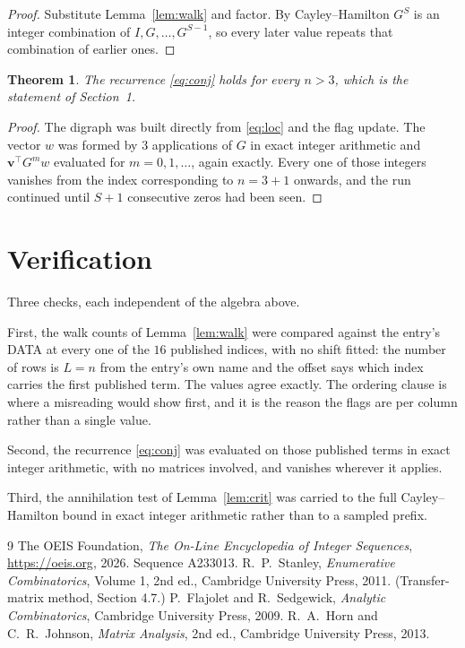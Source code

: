 \documentclass[11pt,a4paper]{article}
\theoremstyle{plain}
\newtheorem{theorem}{Theorem}
\theoremstyle{definition}
\begin{document}
\begin{proof}
Substitute Lemma~\ref{lem:walk} and factor. By Cayley--Hamilton $G^{S}$ is an integer
combination of $I,G,\dots,G^{S-1}$, so every later value repeats that combination of earlier
ones.
\end{proof}

\begin{theorem}
The recurrence \eqref{eq:conj} holds for every $n>3$, which is the statement of
Section~1.
\end{theorem}

\begin{proof}
The digraph was built directly from \eqref{eq:loc} and the flag update. The vector $w$ was
formed by $3$ applications of $G$ in exact integer arithmetic and
$\mathbf{v}^{\!\top}G^{m}w$ evaluated for $m=0,1,\dots$, again exactly. Every one of
those integers vanishes from the index corresponding to $n=3+1$ onwards, and the run
continued until $S+1$ consecutive zeros had been seen.
\end{proof}

\section{Verification}

Three checks, each independent of the algebra above.

First, the walk counts of Lemma~\ref{lem:walk} were compared against the entry's DATA at
every one of the $16$ published indices, with no shift fitted: the number of rows is
$L=n$ from the entry's own name and the offset says which index carries the first
published term. The values agree exactly. The ordering clause is where a misreading would
show first, and it is the reason the flags are per column rather than a single value.

Second, the recurrence \eqref{eq:conj} was evaluated on those published terms in exact
integer arithmetic, with no matrices involved, and vanishes wherever it applies.

Third, the annihilation test of Lemma~\ref{lem:crit} was carried to the full
Cayley--Hamilton bound in exact integer arithmetic rather than to a sampled prefix.

\begin{thebibliography}{9}
 The OEIS Foundation, \emph{The On-Line Encyclopedia of Integer
Sequences}, \url{https://oeis.org}, 2026. Sequence A233013.
 R.~P.~Stanley, \emph{Enumerative Combinatorics}, Volume 1, 2nd ed.,
Cambridge University Press, 2011. (Transfer-matrix method, Section 4.7.)
 P.~Flajolet and R.~Sedgewick, \emph{Analytic Combinatorics}, Cambridge
University Press, 2009.
 R.~A.~Horn and C.~R.~Johnson, \emph{Matrix Analysis}, 2nd ed., Cambridge
University Press, 2013.
\end{thebibliography}
\end{document}
